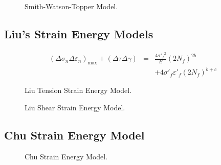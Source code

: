 \documentclass{article}
\begin{document}
\begin{figure}[!htp]
\caption{Smith-Watson-Topper Model.}
\label{Fig:NF-NP-TGMF-SWT}
\end{figure}

\subsection{Liu’s Strain Energy Models}
\begin{eqnarray*}
{\left( {\Delta {\sigma _n}\Delta {\varepsilon _n}} \right)_{\max }} + \left( {\Delta \tau \Delta \gamma } \right) &=& \frac{{4{{\sigma '}_f}^2}}{E}{\left( {2{N_f}} \right)^{2b}}
\\
& & + 4{{\sigma '}_f}{{\varepsilon '}_f}{\left( {2{N_f}} \right)^{b + c}}
\end{eqnarray*}
\begin{figure}[!htp]
\caption{Liu Tension Strain Energy Model.}
\label{Fig:NF-NP-TGMF-Liu1}
\end{figure}

\begin{figure}[!htp]
\caption{Liu Shear Strain Energy Model.}
\label{Fig:NF-NP-TGMF-Liu2}
\end{figure}

\subsection{Chu Strain Energy Model}
\begin{figure}[!htp]
\caption{Chu Strain Energy Model.}
\label{Fig:NF-NP-TGMF-Chu}
\end{figure}

\end{document}
